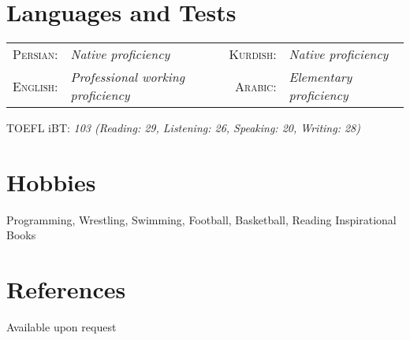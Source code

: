\documentclass[a4paper,10pt]{article}
\newcommand{\langItem}[2]{
	\textsc{ #1:}&\emph{\color{darkgray}#2}}
\newcommand{\TestItem}[2]{
	{ #1: }\emph{\color{darkgray}#2}}
\begin{document}
	\section{Languages and Tests}
		 \begin{tabular}{rl  rl}
		 	\langItem{Persian}{Native proficiency} & \langItem{ Kurdish}{Native proficiency}\\
		 	\langItem{ English}{Professional working proficiency} & \langItem{ Arabic}{Elementary proficiency}\\
		 \end{tabular}

		 \hspace{1pt}\TestItem{ TOEFL iBT}{ 103 (Reading: 29, Listening: 26, Speaking: 20, Writing: 28)}
	\section{Hobbies}
		{\hspace{1 mm} Programming, Wrestling, Swimming, Football, Basketball, Reading Inspirational  Books}\\%
	\section{References}
		{\hspace{1 mm} Available upon request}
			
	
	
\end{document}
